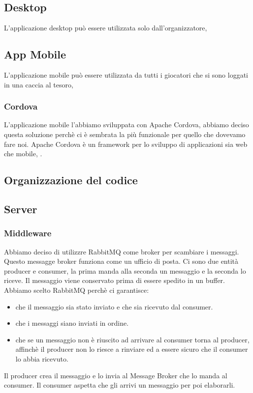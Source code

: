 \documentclass[12pt, italian]{article}
\begin{document}
\subsection{Desktop}
L'applicazione desktop può essere utilizzata solo dall'organizzatore, 
\subsection{App Mobile}
L'applicazione mobile può essere utilizzata da tutti i giocatori che si sono loggati in una caccia al tesoro,
\subsubsection{Cordova}
L'applicazione mobile l'abbiamo sviluppata con Apache Cordova, abbiamo deciso questa soluzione perchè ci è sembrata la più funzionale per quello che dovevamo fare noi. Apache Cordova è un framework per lo sviluppo di applicazioni sia web che mobile, .
\subsection{Organizzazione del codice}

\subsection{Server}
\subsubsection{Middleware}
Abbiamo deciso di utilizzre RabbitMQ come broker per scambiare i messaggi. Questo messagge broker funziona come un ufficio di posta. Ci sono due entità producer e consumer, la prima manda alla seconda un messaggio e la seconda lo riceve. Il messaggio viene conservato prima di essere spedito in un buffer. Abbiamo scelto RabbitMQ perchè ci garantisce:
\begin{itemize}
	\item che il messaggio sia stato inviato e che sia ricevuto dal consumer.
	\item che i messaggi siano inviati in ordine.
	\item che se un messaggio non è riuscito ad arrivare al consumer torna al producer, affinchè il producer non lo riesce a rinviare ed a essere sicuro che il consumer lo abbia ricevuto.
\end{itemize}
Il producer crea il messaggio e lo invia al Message Broker che lo manda al consumer. Il consumer aspetta che gli arrivi un messaggio per poi elaborarli.
\end{document}
